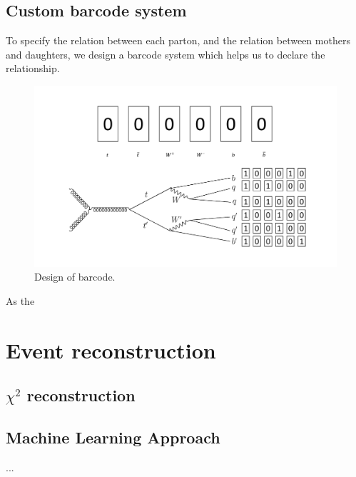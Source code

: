\subsection{Custom barcode system}\label{subsec:barcode}
To specify the relation between each parton, and the relation between mothers and daughters, we design a barcode system which helps us to declare the relationship.

\begin{figure}[h!]
	\includegraphics[width=0.8\linewidth]{Figures/barcode.pdf}
	\caption{Design of barcode.}
	\label{fig:barcode}
\end{figure}

As the 

\section{Event reconstruction}\label{sec:Event reconstruction}

\subsection{$\chi^{2}$ reconstruction}\label{subsec:chi-square}

\subsection{Machine Learning Approach}\label{subsec:ML approach}


...





